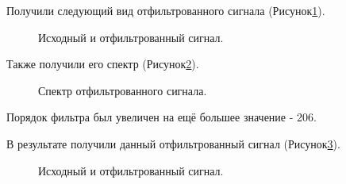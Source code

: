 \documentclass[a4paper,14pt]{extarticle}
\begin{document}
Получили следующий вид отфильтрованного сигнала (Рисунок\ref{008}).

\begin{figure}[H]
\caption{Исходный и отфильтрованный сигнал.}
\label{008}
\end{figure}

Также получили его спектр (Рисунок\ref{009}).

\begin{figure}[H]
\caption{Спектр отфильтрованного сигнала.}
\label{009}
\end{figure}

Порядок фильтра был увеличен на ещё большее значение - 206.

В результате получили данный отфильтрованный сигнал (Рисунок\ref{010}).

\begin{figure}[H]
\caption{Исходный и отфильтрованный сигнал.}
\label{010}
\end{figure}
\end{document}
